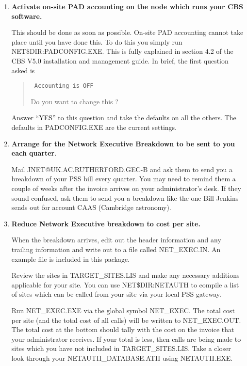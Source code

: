\begin{enumerate}

\item {\bf Activate on-site PAD accounting on the node which runs your
CBS software.}

This should be done as soon as possible. On-site PAD accounting cannot take
place until you have done this. To do this you simply run
NET\$DIR:PADCONFIG.EXE. This is fully explained in section 4.2 of the CBS
V5.0 installation and management guide. In brief, the first question asked
is

\begin{quote} \tt
Accounting is OFF

Do you want to change this ?
\end{quote}


Answer ``YES'' to this question and take the defaults on all the others. The
defaults in PADCONFIG.EXE are the current settings.

\item {\bf Arrange for the Network Executive Breakdown to be sent to you
each quarter}.

Mail JNET@UK.AC.RUTHERFORD.GEC-B and ask them to send you a breakdown of
your PSS bill every quarter. You may need to remind them a couple of weeks
after the invoice arrives on your administrator's desk. If they sound
confused, ask them to send you a breakdown like the one Bill Jenkins sends
out for account CAAS (Cambridge astronomy).

\item {\bf Reduce Network Executive breakdown to cost per site.}

When the breakdown arrives, edit out the header information and any trailing
information and write out to a file called NET\_\/EXEC.IN. An example file is
included in this package.

Review the sites in TARGET\_\/SITES.LIS and make any necessary additions
applicable for your site. You can use NET\$DIR:NETAUTH to compile a list of
sites which can be called from your site via your local PSS gateway.

Run NET\_\/EXEC.EXE via the global symbol NET\_\/EXEC. The total cost per site (and
the total cost of all calls) will be written to NET\_\/EXEC.OUT. The total cost at
the bottom should tally with the cost on the invoice that your administrator
receives. If your total is less, then calls are being made to sites which you
have not included in TARGET\_\/SITES.LIS. Take a closer look through your
NETAUTH\_\/DATABASE.ATH using NETAUTH.EXE.


\end{enumerate}
